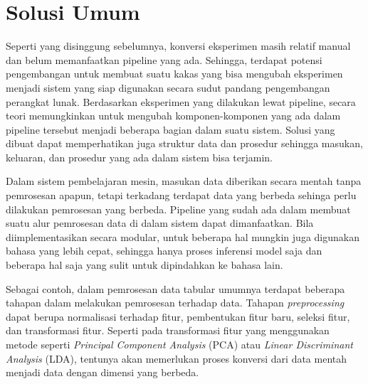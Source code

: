 \section{Solusi Umum}

Seperti yang disinggung sebelumnya, konversi eksperimen masih relatif manual dan belum memanfaatkan pipeline yang ada.
Sehingga, terdapat potensi pengembangan untuk membuat suatu kakas yang bisa mengubah eksperimen menjadi sistem yang siap digunakan secara sudut pandang pengembangan perangkat lunak.
Berdasarkan eksperimen yang dilakukan lewat pipeline, secara teori memungkinkan untuk mengubah komponen-komponen yang ada dalam pipeline tersebut menjadi beberapa bagian dalam suatu sistem.
Solusi yang dibuat dapat memperhatikan juga struktur data dan prosedur sehingga masukan, keluaran, dan prosedur yang ada dalam sistem bisa terjamin.

Dalam sistem pembelajaran mesin, masukan data diberikan secara mentah tanpa pemrosesan apapun, tetapi terkadang terdapat data yang berbeda sehinga perlu dilakukan pemrosesan yang berbeda.
Pipeline yang sudah ada dalam membuat suatu alur pemrosesan data di dalam sistem dapat dimanfaatkan.
Bila diimplementasikan secara modular, untuk beberapa hal mungkin juga digunakan bahasa yang lebih cepat, sehingga hanya proses inferensi model saja dan beberapa hal saja yang sulit untuk dipindahkan ke bahasa lain.

Sebagai contoh, dalam pemrosesan data tabular umumnya terdapat beberapa tahapan dalam melakukan pemrosesan terhadap data.
Tahapan \textit{preprocessing} dapat berupa normalisasi terhadap fitur, pembentukan fitur baru, seleksi fitur, dan transformasi fitur.
Seperti pada transformasi fitur yang menggunakan metode seperti \textit{Principal Component Analysis} (PCA) atau \textit{Linear Discriminant Analysis} (LDA), tentunya akan memerlukan proses konversi dari data mentah menjadi data dengan dimensi yang berbeda.
